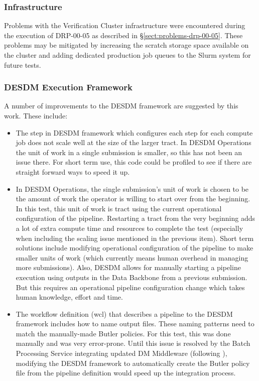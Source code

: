 \documentclass[DM,lsstdraft,STR,toc]{lsstdoc}
\begin{document}
\subsubsection{Infrastructure}

Problems with the Verification Cluster infrastructure were encountered during the execution of DRP-00-05 as described in \S\ref{sect:problems-drp-00-05}.
These problems may be mitigated by increasing the scratch storage space available on the cluster and adding dedicated production job queues to the Slurm system for future tests.

\subsubsection{DESDM Execution Framework}

A number of improvements to the DESDM framework are suggested by this work.
These include:

\begin{itemize}
  \item{
    The step in DESDM framework which configures each step for each compute job does not scale well at the size of the larger tract.
    In DESDM Operations the unit of work in a single submission is smaller, so this has not been an issue there.
    For short term use, this code could be profiled to see if there are straight forward ways to speed it up.
  }

  \item{
    In DESDM Operations, the single submission's unit of work is chosen to be the amount of work the operator is willing to start over from the beginning.
    In this test, this unit of work is tract using the current operational configuration of the pipeline.
    Restarting a tract from the very beginning adds a lot of extra compute time and resources to complete the test (especially when including the scaling issue
mentioned in the previous item).
    Short term solutions include modifying operational configuration of the pipeline to make smaller units of work (which currently means human overhead in managing more submissions).
    Also, DESDM allows for manually starting a pipeline execution using outputs in the Data Backbone from a previous submission.
    But this requires an operational pipeline configuration change which takes human knowledge, effort and time.
  }

  \item{
    The workflow definition (wcl) that describes a pipeline to the DESDM framework includes how to name output files.
    These naming patterns need to match the manually-made Butler policies.
    For this test, this was done manually and was very error-prone.
    Until this issue is resolved by the Batch Processing Service integrating
    updated DM Middleware (following ), modifying the DESDM framework to automatically create the Butler policy file from the pipeline definition would speed up the integration process.
  }

\end{itemize}
\end{document}

